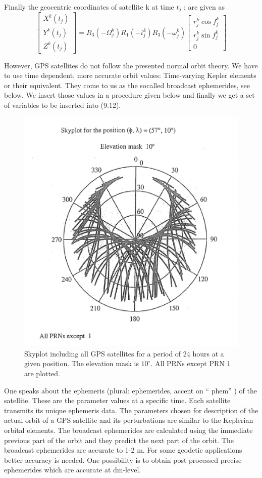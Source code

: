 	Finally the geocentric coordinates of satellite k at time $t_j$ ; are given as
	\begin{equation}
		\begin{bmatrix}
			X^k(t_j) \\ Y^k(t_j) \\ Z^k(t_j) 
		\end{bmatrix}
		=
		R_3(-\Omega ^k_j)R_1(-i^k_j)R_3(-\omega ^k_j)
		\begin{bmatrix}
			r^k_j \cos f^k_j \\
			r^k_j \sin f^k_j \\
			0
		\end{bmatrix}
	\end{equation}
		
	However, GPS satellites do not follow the presented normal orbit theory. We have to use time dependent, more accurate orbit values: Time-varying Kepler elements or their equivalent. They come to us as the socalled broadcast ephemerides, see below. We insert those values in a procedure given below and finally we get a set of variables to be inserted into (9.12).
	\begin{figure}
		\centering
		\includegraphics[width=0.7\linewidth]{TeX_files/Part03/chapter09/image/9-9}
		\caption{Skyplot including all GPS satellites for a period of 24 hours at a given position. The elevation mask is $10^\circ$. All PRNs except PRN 1 are plotted.}
		\label{fig:9-9}
	\end{figure}
	
	One speaks about the ephemeris (plural: ephemerides, accent on “ phem” ) of the satellite. These are the parameter values at a specific time. Each satellite transmits its unique ephemeris data. The parameters chosen for description of the actual orbit of a GPS satellite and its perturbations are similar to the Keplerian orbital elements. The broadcast ephemerides are calculated using the immediate previous part of the orbit and they predict the next part of the orbit. The broadcast ephemerides are accurate to 1-2 m. For some geodetic applications better accuracy is needed. One possibility is to obtain post processed precise ephemerides which are accurate at dm-level.
		

